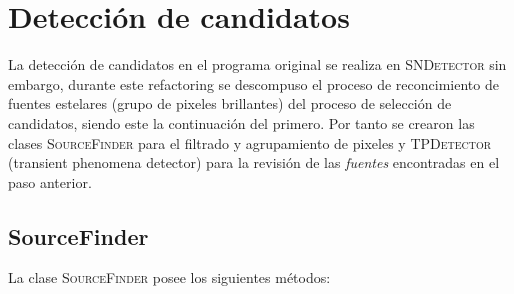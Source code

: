 \section{Detecci\'on de candidatos}
La detecci\'on de candidatos en el programa original se realiza en \textsc{SNDetector} sin embargo, durante este refactoring se descompuso el proceso de reconcimiento de fuentes estelares (grupo de pixeles brillantes) del proceso de selecci\'on de candidatos, siendo este la continuaci\'on del primero. Por tanto se crearon las clases \textsc{SourceFinder} para el filtrado y agrupamiento de pixeles y \textsc{TPDetector} (transient phenomena detector) para la revisi\'on de las \textit{fuentes} encontradas en el paso anterior.
\subsection{SourceFinder}
La clase \textsc{SourceFinder} posee los siguientes m\'etodos:
